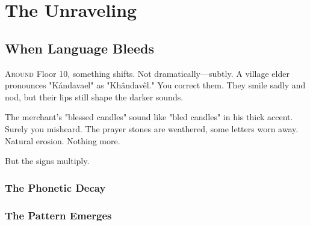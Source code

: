 \documentclass[11pt,a4paper,twoside]{book}
\newcommand{\fadetext}[1]{%
    \textcolor{ink!30}{#1}%
}
\newcommand{\fancybreak}{%
    \begin{center}
    \pgfornament[width=3cm]{88}
    \end{center}
}
\begin{document}
\fancybreak

\part{The Unraveling}

\chapter{When Language Bleeds}

\lettrine[lines=4]{\color{dusk}A}{round} Floor 10, something shifts. Not dramatically—subtly. A village elder pronounces "Kándavael" as "Khândavêl." You correct them. They smile sadly and nod, but their lips still shape the darker sounds. 

The merchant's "blessed candles" sound like "bled candles" in his thick accent. Surely you misheard. The prayer stones are weathered, some letters worn away. Natural erosion. Nothing more.

But the signs multiply.

\section{The Phonetic Decay}

\begin{center}
\end{center}

\section{The Pattern Emerges}
\end{document}
